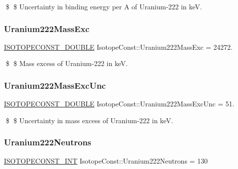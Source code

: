 \$ \$ Uncertainty in binding energy per A of Uranium-\/222 in keV. \mbox{\label{group___isotope_const-_uranium-_u222_gaf81083d8c19f625e2eb8d897b7654de5}} 
\subsubsection{\texorpdfstring{Uranium222\+Mass\+Exc}{Uranium222MassExc}}
{\footnotesize\ttfamily \mbox{\hyperlink{group___isotope_const-_macros_ga8f45a7272ce02c0b4c65c44636ed719a}{I\+S\+O\+T\+O\+P\+E\+C\+O\+N\+S\+T\+\_\+\+D\+O\+U\+B\+LE}} Isotope\+Const\+::\+Uranium222\+Mass\+Exc = 24272.}

\$ \$ Mass excess of Uranium-\/222 in keV. \mbox{\label{group___isotope_const-_uranium-_u222_gab7d09cd6c113d87bc8e39cad11c0cf0a}} 
\subsubsection{\texorpdfstring{Uranium222\+Mass\+Exc\+Unc}{Uranium222MassExcUnc}}
{\footnotesize\ttfamily \mbox{\hyperlink{group___isotope_const-_macros_ga8f45a7272ce02c0b4c65c44636ed719a}{I\+S\+O\+T\+O\+P\+E\+C\+O\+N\+S\+T\+\_\+\+D\+O\+U\+B\+LE}} Isotope\+Const\+::\+Uranium222\+Mass\+Exc\+Unc = 51.}

\$ \$ Uncertainty in mass excess of Uranium-\/222 in keV. \mbox{\label{group___isotope_const-_uranium-_u222_ga81eafd97c372be0141beed1d60cd477a}} 
\subsubsection{\texorpdfstring{Uranium222\+Neutrons}{Uranium222Neutrons}}
{\footnotesize\ttfamily \mbox{\hyperlink{group___isotope_const-_macros_ga5f18360b3e99483a35c32d789e62621c}{I\+S\+O\+T\+O\+P\+E\+C\+O\+N\+S\+T\+\_\+\+I\+NT}} Isotope\+Const\+::\+Uranium222\+Neutrons = 130}

